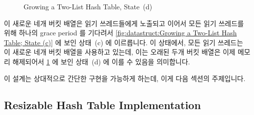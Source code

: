 \begin{figure}[tb]
\centering
{}
\caption{Growing a Two-List Hash Table, State~(d)}
\label{fig:datastruct:Growing a Two-List Hash Table; State (d)}
\end{figure}

이 새로운 네개 버킷 배열은 읽기 쓰레드들에게 노출되고 이어서 모든 읽기 쓰레드를
위해 하나의 grace period 를 기다려서
\cref{fig:datastruct:Growing a Two-List Hash Table; State (c)} 에 보인 상태~(c)
에 이르릅니다.
이 상태에서, 모든 읽기 쓰레드는 이 새로운 네개 버킷 배열을 사용하고 있는데,
이는 오래된 두개 버킷 배열은 이제 메모리 해제되어서
\cref{fig:datastruct:Growing a Two-List Hash Table; State (d)} 에 보인 상태~(d)
에 이를 수 있음을 의미합니다.

이 설계는 상대적으로 간단한 구현을 가능하게 하는데, 이게 다음 섹션의
주제입니다.

\subsection{Resizable Hash Table Implementation}
\label{sec:datastruct:Resizable Hash Table Implementation}

